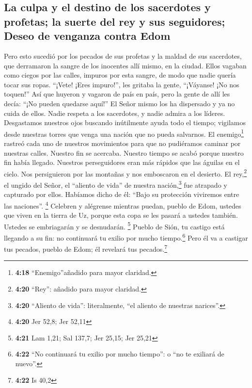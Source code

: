 \hypertarget{la-culpa-y-el-destino-de-los-sacerdotes-y-profetas-la-suerte-del-rey-y-sus-seguidores-deseo-de-venganza-contra-edom}{%
\subsection{La culpa y el destino de los sacerdotes y profetas; la
suerte del rey y sus seguidores; Deseo de venganza contra
Edom}\label{la-culpa-y-el-destino-de-los-sacerdotes-y-profetas-la-suerte-del-rey-y-sus-seguidores-deseo-de-venganza-contra-edom}}

 Pero esto sucedió por los pecados de sus profetas y la
maldad de sus sacerdotes, que derramaron la sangre de los inocentes allí
mismo, en la ciudad.  Ellos vagaban como ciegos por las
calles, impuros por esta sangre, de modo que nadie quería tocar sus
ropas.  ``¡Vete! ¡Eres impuro!'', les gritaba la gente,
``¡Váyanse! ¡No nos toquen!'' Así que huyeron y vagaron de país en país,
pero la gente de allí les decía: ``¡No pueden quedarse aquí!''
 El Señor mismo los ha dispersado y ya no cuida de ellos.
Nadie respeta a los sacerdotes, y nadie admira a los líderes.
 Desgastamos nuestros ojos buscando inútilmente ayuda
todo el tiempo; vigilamos desde nuestras torres que venga una nación que
no pueda salvarnos.  El enemigo\footnote{\textbf{4:18}
  ``Enemigo''añadido para mayor claridad.} rastreó cada uno de nuestros
movimientos para que no pudiéramos caminar por nuestras calles. Nuestro
fin se acercaba. Nuestro tiempo se acabó porque nuestro fin había
llegado.  Nuestros perseguidores eran más rápidos que las
águilas en el cielo. Nos persiguieron por las montañas y nos emboscaron
en el desierto.  El rey,\footnote{\textbf{4:20} ``Rey'':
  añadido para mayor claridad.} el ungido del Señor, el ``aliento de
vida'' de nuestra nación,\footnote{\textbf{4:20} ``Aliento de vida'':
  literalmente, ``el aliento de nuestras narices''.} fue atrapado y
capturado por ellos. Habíamos dicho de él: ``Bajo su protección
viviremos entre las naciones''. \footnote{\textbf{4:20} Jer 52,8; Jer
  52,11}  Celebren y alégrense mientras puedan, pueblo de
Edom, ustedes que viven en la tierra de Uz, porque esta copa se les
pasará a ustedes también. Ustedes se embriagarán y se desnudarán.
\footnote{\textbf{4:21} Lam 1,21; Sal 137,7; Jer 25,15; Jer 25,21}
 Pueblo de Sión, tu castigo está llegando a su fin: no
continuará tu exilio por mucho tiempo.\footnote{\textbf{4:22} ``No
  continuará tu exilio por mucho tiempo'': o ``no te exiliará de
  nuevo''.} Pero él va a castigar tus pecados, pueblo de Edom; él
revelará tus pecados.\footnote{\textbf{4:22} Is 40,2}

